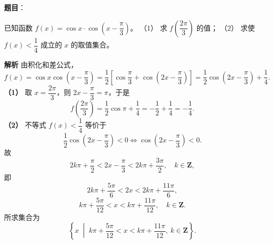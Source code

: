\begin{answer}

\textbf{题目}：

已知函数 $f(x)=\cos x\cdot\cos\left(x-\dfrac\pi3\right)$。
（1） 求 $f\left(\dfrac{2\pi}3\right)$ 的值；
（2） 求使 $f(x)<\dfrac14$ 成立的 $x$ 的取值集合。

\textbf{解析}
由积化和差公式，
\nopagebreak[4]
\[f(x)=\cos x\cos\left(x-\frac\pi3\right)=\frac12\left[\cos\frac\pi3+\cos\left(2x-\frac\pi3\right)\right]=\frac12\cos\left(2x-\frac\pi3\right)+\frac14.\]
\textbf{（1）} 取 $x=\dfrac{2\pi}3$，则 $2x-\dfrac\pi3=\pi$，于是
\nopagebreak[4]
\[f\left(\frac{2\pi}3\right)=\frac12\cos\pi+\frac14=-\frac12+\frac14=-\frac14.\]
\textbf{（2）} 不等式 $f(x)<\dfrac14$ 等价于
\nopagebreak[4]
\[\frac12\cos\left(2x-\frac\pi3\right)<0\iff\cos\left(2x-\frac\pi3\right)<0.\]
故
\nopagebreak[4]
\[2k\pi+\frac\pi2<2x-\frac\pi3<2k\pi+\frac{3\pi}2,\quad k\in\mathbf Z,\]
即
\nopagebreak[4]
\[2k\pi+\frac{5\pi}6<2x<2k\pi+\frac{11\pi}6,\]
\nopagebreak[4]
\[k\pi+\frac{5\pi}{12}<x<k\pi+\frac{11\pi}{12},\quad k\in\mathbf Z.\]
所求集合为
\nopagebreak[4]
\[\left\{x\;\middle|\;k\pi+\frac{5\pi}{12}<x<k\pi+\frac{11\pi}{12},\ k\in\mathbf Z\right\}.\]



\end{answer}
